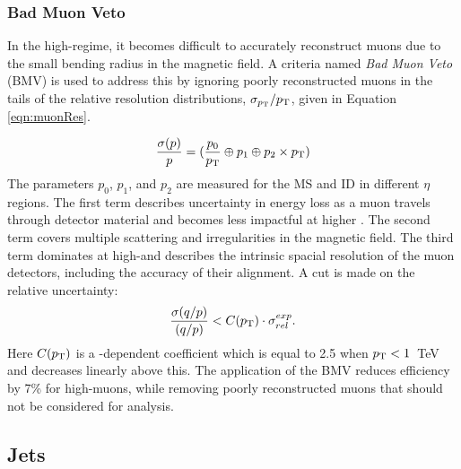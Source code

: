 \subsubsection{Bad Muon Veto}\label{sec:bmv}

In the high-\pt regime, it becomes difficult to accurately reconstruct muons due to the small bending radius in the magnetic field.
A criteria named \emph{Bad Muon Veto} (BMV) is used to address this by ignoring poorly reconstructed muons in the tails of the relative \pt resolution distributions, $\sigma_{p_\text{T}}/p_\text{T}$, given in Equation \ref{eqn:muonRes}.

\begin{equation}\begin{split}\label{eqn:muonRes}
    \frac{\sigma(p)}{p}=(\frac{p_0}{p_\text{T}}\oplus p_1 \oplus p_2\times p_\text{T})
\end{split}\end{equation} 
The parameters $p_0$, $p_1$, and $p_2$ are measured for the MS and ID in different $\eta$ regions. 
The first term describes uncertainty in energy loss as a muon travels through detector material and becomes less impactful at higher \pt.
The second term covers multiple scattering and irregularities in the magnetic field.
The third term dominates at high-\pt and describes the intrinsic spacial resolution of the muon detectors, including the accuracy of their alignment. \cite{muonReco}
A cut is made on the relative uncertainty:
\begin{equation}
\frac{\sigma(q/p)}{(q/p)} < C(p_\text{T})\cdot \sigma_{rel}^{exp}.
\end{equation}
Here $C(p_\text{T})$ is a \pt-dependent coefficient which is equal to 2.5 when $p_\text{T}<1$~TeV and decreases linearly above this.
The application of the BMV reduces efficiency by 7\% for high-\pt muons, while removing poorly reconstructed muons that should not be considered for analysis.


\subsection{Jets}\label{sec:expJets}

